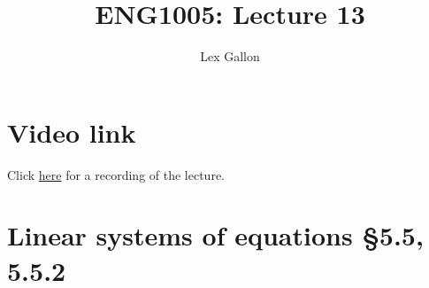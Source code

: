 \documentclass[11pt]{article}
\begin{document}
\title{ENG1005: Lecture 13}
\author{Lex Gallon}
\maketitle

\tableofcontents

\section*{Video link}
Click \href{https://echo360.org.au/lesson/G_8402119b-734b-4e1e-a3b4-7e907e86ddba_b944cecf-8ba5-40d3-a870-0243a0a9e78c_2020-04-21T15:58:00.000_2020-04-21T16:53:00.000/classroom#sortDirection=desc}{here} for a recording of the lecture.

\section{Linear systems of equations §5.5, 5.5.2}
\end{document}
